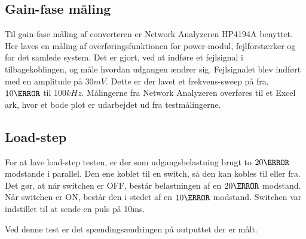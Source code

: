 \subsection{Gain-fase måling}
Til gain-fase måling af converteren er Network Analyzeren HP4194A\cite{hp4194} benyttet. Her laves en måling af overføringsfunktionen for power-modul, fejlforstærker og for det samlede system. Det er gjort, ved at indføre et fejlsignal i tilbagekoblingen, og måle hvordan udgangen ændrer sig. Fejlsignalet blev indført med en amplitude på $30mV$. Dette er der lavet et frekvens-sweep på fra, $10\Hz$ til $100kHz$. Målingerne fra Network Analyzeren overføres til et Excel ark, hvor et bode plot er udarbejdet ud fra testmålingerne. 

\subsection{Load-step}
For at lave load-step testen, er der som udgangsbelastning brugt to $20\ohm$ modstande i parallel. Den ene koblet til en switch, så den kan kobles til eller fra. Det gør, at når switchen er OFF, består belastningen af en $20\ohm$ modstand. Når switchen er ON, består den i stedet af en $10\ohm$ modstand. Switchen var indstillet til at sende en puls på 10ms.

\noindent Ved denne test er det spændingsændringen på outputtet der er målt.